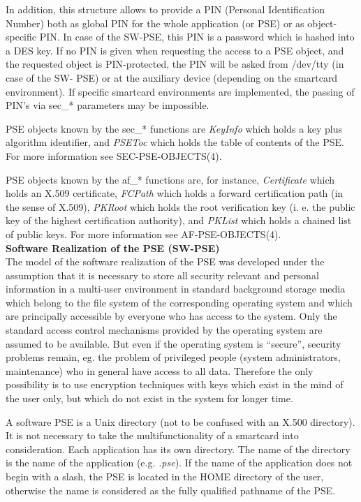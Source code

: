 In addition, this structure allows to provide a PIN (Personal Identification 
Number)
both as global PIN for the whole application (or PSE) or as object-specific 
PIN.
In case of the SW-PSE, this PIN is a password which is hashed into a DES 
key. If no
PIN is given when requesting the access to a PSE object, and the requested 
object
is PIN-protected, the PIN will be asked from /dev/tty (in case of the SW-
PSE) or
at the auxiliary device (depending on the smartcard environment). If 
specific
smartcard environments are implemented, the passing of PIN's via sec\_* 
parameters
may be impossible.

PSE objects known by the sec\_* functions are {\em 
KeyInfo} which holds a key
plus algorithm identifier, and {\em PSEToc} which holds the table of 
contents of the
PSE. For more information see SEC-PSE-OBJECTS(4).

PSE objects known by the af\_* functions are, for instance, {\em Certificate} 
which holds an X.509 certificate,
{\em FCPath} which holds a forward certification path (in the sense of 
X.509), {\em PKRoot} which
holds the root verification key (i. e. the public key of the highest 
certification authority),
and {\em PKList} which holds a chained list of public keys. For more 
information see
AF-PSE-OBJECTS(4). \\ [1em] 
{\bf Software Realization of the PSE (SW-PSE)} \\ [1em]
The model of the software realization of the PSE was developed under the 
assumption that
it is necessary to store all security relevant and personal information in 
a multi-user
environment in standard 
background storage media which belong to the file system of the 
corresponding
operating system and which are principally accessible by everyone who
has access to the system. Only the standard access control mechanisms 
provided by the operating system are assumed to be available. But even if 
the
operating system is ``secure'', security problems remain, eg. the problem
of privileged people (system administrators, maintenance) who in general 
have
access to all data. Therefore the only possibility is to use encryption 
techniques
with keys which exist in the mind of the user only, but which do not exist 
in
the system for longer time.

A software PSE is a Unix directory (not to be confused with an X.500 
directory).
It is not necessary to take the multifunctionality of a smartcard into 
consideration.
Each application has its own directory. The name of the directory is the 
name of the
application (e.g. {\em .pse}). If the name of the application does not 
begin with a slash,
the PSE is located in the HOME directory of the user, otherwise the name is 
considered 
as the fully qualified pathname of the PSE.

